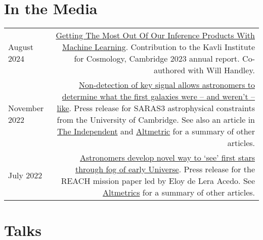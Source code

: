 \documentclass{article}
\begin{document}
\section*{In the Media}

\begin{tabular}{L!{\vrule}R}
    August 2024 & \href{https://www.kicc.cam.ac.uk/aboutus/kicc-annual-reports}{Getting The Most Out Of Our Inference Products With Machine Learning}. Contribution to the Kavli Institute for Cosmology, Cambridge 2023 annual report. Co-authored with Will Handley. \\
	November 2022 & \href{https://www.cam.ac.uk/research/news/non-detection-of-key-signal-allows-astronomers-to-determine-what-the-first-galaxies-were-and-werent}{Non-detection of key signal allows astronomers to determine what the first galaxies were – and weren’t – like}. Press release for SARAS3 astrophysical constraints from the University of Cambridge. See also an article in \href{https://www.independent.co.uk/space/galaxies-beginning-cosmic-dawn-signal-b2234570.html?amp}{The Independent} and \href{https://nature.altmetric.com/details/139089769/news}{Altmetric} for a summary of other articles. \\
	July 2022 & \href{https://www.cam.ac.uk/research/news/astronomers-develop-novel-way-to-see-the-first-stars-through-the-fog-of-the-early-universe}{Astronomers develop novel way to ‘see’ first stars through fog of early Universe}. Press release for the REACH mission paper led by Eloy de Lera Acedo. See \href{https://nature.altmetric.com/details/132932581/news}{Altmetrics} for a summary of other articles.
\end{tabular}

\pagebreak

\section*{Talks}
\end{document}
